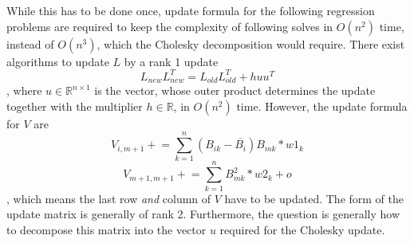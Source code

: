 \documentclass{article}
\begin{document}
\par
While this has to be done once, update formula for the following regression problems are required to keep the complexity of following solves in $O(n^2)$ time, instead of $O(n^3)$, which the Cholesky decomposition would require. There exist algorithms to update $L$ by a rank 1 update
\begin{equation}
    L_{new} L_{new}^T= L_{old}L_{old}^T + h u u^T
\end{equation}
, where $u \in \mathbb{R}^{n \times 1}$ is the vector, whose outer product determines the update together with the multiplier $h \in \mathbb{R}$, in $O(n^2)$ time. However, the update formula for $V$ are
\begin{equation}
    V_{i, m+1} \mathrel{+}=  \sum_{k=1}^{n} (B_{ik} - \overline{B_i})B_{mk} * w1_k 
\end{equation}
\begin{equation}
    V_{m+1, m+1} \mathrel{+}=  \sum_{k=1}^{n} B_{mk}^2 * w2_k + o
\end{equation}
, which means the last row \textit{and} column of $V$ have to be updated.
The form of the update matrix is generally of rank 2. Furthermore, the question is generally how to decompose this matrix into the vector $u$ required for the Cholesky update.
\end{document}
